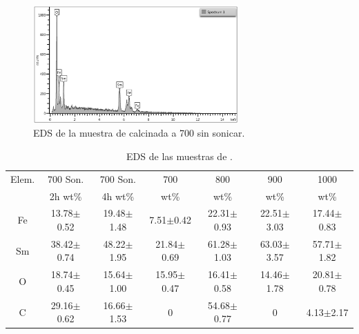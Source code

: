 \documentclass[../main.tex]{subfiles}
\begin{document}
\begin{figure}[H]
    \centering
    \includegraphics[width=0.7\textwidth]{fig/resEDSSama.png}
    \caption{EDS de la muestra de \sama{} calcinada a 700\gradoC{} sin sonicar.}
    \label{fig:resEDSSama}
\end{figure}
        \begin{table}[H]
            \centering
        \begin{tabular}{|c||c|c|c|c|c|c|}
        \hline
        Elem. &700\gradoC{} Son.&700\gradoC{} Son.&700\gradoC{}&800\gradoC{}&900\gradoC{}&1000\gradoC{}\\
        &2h wt\%&4h wt\%&wt\%&wt\%&wt\%&wt\%\\
        \hline\hline
        Fe &13.78$\pm$0.52&19.48$\pm$1.48& 7.51$\pm$0.42 & 22.31$\pm$0.93 & 22.51$\pm$3.03 & 17.44$\pm$0.83 \\
        Sm &38.42$\pm$0.74&48.22$\pm$1.95& 21.84$\pm$0.69 & 61.28$\pm$1.03 & 63.03$\pm$3.57 & 57.71$\pm$1.82 \\
        O &18.74$\pm$0.45&15.64$\pm$1.00& 15.95$\pm$0.47 & 16.41$\pm$0.58 & 14.46$\pm$1.78 & 20.81$\pm$0.78 \\
        C &29.16$\pm$0.62&16.66$\pm$1.53& 0 & 54.68$\pm$0.77 & 0 & 4.13$\pm$2.17 \\ 
        \hline
        \end{tabular} 
            \caption{EDS de las muestras de \sama{}.}
            \label{tab:EDSSm}
\end{table}
\end{document}
